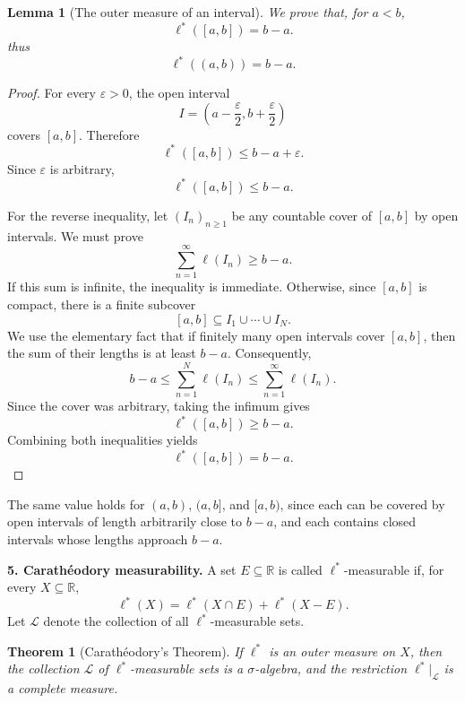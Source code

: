 \documentclass[10pt,a4paper]{book}
\newtheorem{theorem}{Theorem}[section]
\newtheorem{lemma}{Lemma}[section]
\begin{document}
\begin{lemma}[The outer measure of an interval]


    We prove that, for $a<b$,
    \[
        \boxed{\ell^*([a,b])=b-a.}
    \]
    thus
    \[
        \ell^*( (a,b) )=b-a.
    \]

\end{lemma}


\begin{proof}

    For every $\varepsilon>0$, the open interval
    \[
        I=\left(a-\frac{\varepsilon}{2},
        b+\frac{\varepsilon}{2}\right)
    \]
    covers $[a,b]$. Therefore
    \[
        \ell^*([a,b])\leq b-a+\varepsilon.
    \]
    Since $\varepsilon$ is arbitrary,
    \[
        \ell^*([a,b])\leq b-a.
    \]

    For the reverse inequality, let $(I_n)_{n\geq1}$ be any countable cover of $[a,b]$ by open intervals. We must prove
    \[
        \sum_{n=1}^{\infty}\ell(I_n)\geq b-a.
    \]
    If this sum is infinite, the inequality is immediate. Otherwise, since $[a,b]$ is compact, there is a finite subcover
    \[
        [a,b]\subseteq I_1\cup\cdots\cup I_N.
    \]
    We use the elementary fact that if finitely many open intervals cover $[a,b]$, then the sum of their lengths is at least $b-a$. Consequently,
    \[
        b-a\leq\sum_{n=1}^{N}\ell(I_n)
        \leq\sum_{n=1}^{\infty}\ell(I_n).
    \]
    Since the cover was arbitrary, taking the infimum gives
    \[
        \ell^*([a,b])\geq b-a.
    \]
    Combining both inequalities yields
    \[
        \boxed{\ell^*([a,b])=b-a.}
    \]

\end{proof}

The same value holds for $(a,b)$, $(a,b]$, and $[a,b)$, since each can be covered by open intervals of length arbitrarily close to $b-a$, and each contains closed intervals whose lengths approach $b-a$.


\textbf{5. Carathéodory measurability.}
A set $E\subseteq\mathbb R$ is called $\ell^*$-measurable if, for every $X\subseteq\mathbb R$,
\[
    \boxed{
        \ell^*(X)=
        \ell^*(X\cap E)+\ell^*(X - E).
    }
\]
Let $\mathcal L$ denote the collection of all $\ell^*$-measurable sets.



\begin{theorem}[Carathéodory's Theorem]
    If $\ell^*$ is an outer measure on $X$, then the collection $\mathcal L$ of $\ell^*$-measurable sets is a $\sigma$-algebra, and the restriction
    $
        \ell^*|_{\mathcal L}
    $
    is a complete measure.

\end{theorem}
\end{document}
